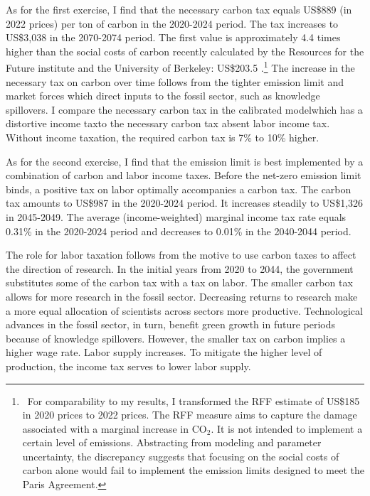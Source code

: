 As for the first exercise, I find that the necessary carbon tax equals US\$889 (in 2022 prices) per ton of carbon in the 2020-2024 period. The tax increases to US\$3,038 in the 2070-2074 period. The first value is approximately 4.4 times higher than the social costs of carbon recently calculated by the Resources for the Future institute and the University of Berkeley: US\$203.5 \citep{Rennert2022ComprehensiveCO2}.\footnote{\  For comparability to my results, I transformed the RFF estimate of US\$185 in 2020 prices to 2022 prices. The RFF measure aims to capture the damage associated with a marginal increase in CO$_2$. It is not intended to implement a certain level of emissions. Abstracting from modeling and parameter uncertainty, the discrepancy suggests that focusing on the social costs of carbon alone would fail to implement the emission limits designed to meet the Paris Agreement. } 
The  increase in the necessary tax on carbon over time follows from the tighter emission limit and market forces which direct inputs to the fossil sector, such as knowledge spillovers. I compare the necessary carbon tax in the calibrated model\textemdash which has a distortive income tax\textemdash to the necessary carbon tax absent labor income tax. Without income taxation, the required carbon tax is  7\% to 10\% higher.

As for the second exercise, I find that the emission limit is best implemented by a combination of carbon and labor income taxes. Before the net-zero emission limit binds, a positive tax on labor optimally accompanies a carbon tax. The carbon tax amounts to US\$987 in the 2020-2024 period. It increases steadily to US\$1,326 in 2045-2049. The average (income-weighted) marginal income tax rate equals 0.31\% in the 2020-2024 period and decreases to 0.01\% in the 2040-2044 period.

The role for labor taxation follows from the  motive to use carbon taxes to affect the direction of research. In the initial years from 2020 to 2044, the government substitutes some of the carbon tax with a tax on labor. The smaller carbon tax allows for more research in the fossil sector. Decreasing returns to research make a more equal allocation of scientists across sectors more productive. Technological advances in the fossil sector, in turn, benefit green growth in future periods because of knowledge spillovers. However, the smaller tax on carbon implies a higher wage rate. Labor supply increases. To mitigate the higher level of production, the income tax serves to lower labor supply.

